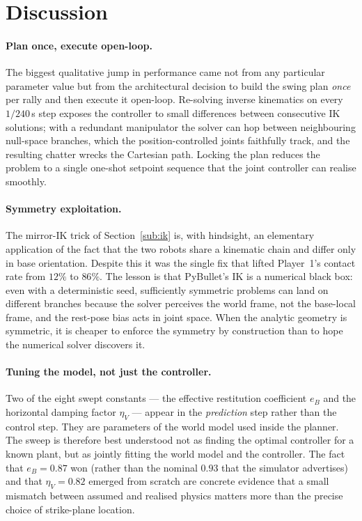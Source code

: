 \section{Discussion}
\label{sec:discussion}

\paragraph{Plan once, execute open-loop.}
The biggest qualitative jump in performance came not from any particular
parameter value but from the architectural decision to build the swing
plan \emph{once} per rally and then execute it open-loop. Re-solving
inverse kinematics on every $1/240$\,s step exposes the controller to
small differences between consecutive IK solutions; with a redundant
manipulator the solver can hop between neighbouring null-space branches,
which the position-controlled joints faithfully track, and the resulting
chatter wrecks the Cartesian path. Locking the plan reduces the problem
to a single one-shot setpoint sequence that the joint controller can
realise smoothly.

\paragraph{Symmetry exploitation.}
The mirror-IK trick of Section~\ref{sub:ik} is, with hindsight, an
elementary application of the fact that the two robots share a
kinematic chain and differ only in base orientation. Despite this it
was the single fix that lifted Player~1's contact rate from $12\%$ to
$86\%$. The lesson is that PyBullet's IK is a numerical black box: even
with a deterministic seed, sufficiently symmetric problems can land on
different branches because the solver perceives the world frame, not
the base-local frame, and the rest-pose bias acts in joint space. When
the analytic geometry is symmetric, it is cheaper to enforce the
symmetry by construction than to hope the numerical solver discovers it.

\paragraph{Tuning the model, not just the controller.}
Two of the eight swept constants --- the effective restitution
coefficient $e_{B}$ and the horizontal damping factor $\eta_{V}$ ---
appear in the \emph{prediction} step rather than the control step.
They are parameters of the world model used inside the planner. The
sweep is therefore best understood not as finding the optimal
controller for a known plant, but as jointly fitting the world model
and the controller. The fact that $e_{B}=0.87$ won (rather than the
nominal $0.93$ that the simulator advertises) and that $\eta_{V}=0.82$
emerged from scratch are concrete evidence that a small mismatch
between assumed and realised physics matters more than the precise
choice of strike-plane location.

